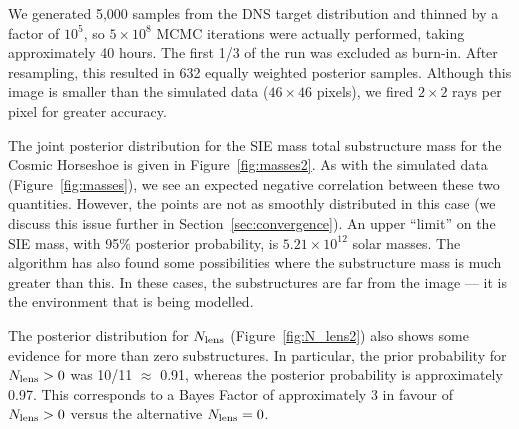 \documentclass[useAMS,usenatbib]{mn2e}
\begin{document}
We generated 5,000 samples from the DNS target distribution and thinned
by a factor of $10^5$, so $5 \times 10^8$ MCMC iterations were actually
performed, taking approximately 40 hours. The first 1/3 of the run was
excluded as burn-in. After resampling, this resulted in 632
equally weighted posterior samples. Although this image is smaller than the
simulated data ($46 \times 46$ pixels), we fired $2 \times 2$ rays per pixel
for greater accuracy.

The joint posterior distribution for the SIE mass total substructure mass
for the Cosmic Horseshoe is given in Figure~\ref{fig:masses2}. As with
the simulated data (Figure~\ref{fig:masses}), we see an expected negative
correlation between these two quantities. However, the points are not as
smoothly distributed in this case (we discuss this issue further
in Section~\ref{sec:convergence}). An upper ``limit'' on the SIE mass, with
95\% posterior probability, is $5.21 \times 10^{12}$ solar masses.
The algorithm has also found
some possibilities where the substructure mass is much greater than this. In
these cases, the substructures are far from the image --- it is the environment
that is being modelled.

The posterior distribution for
$N_{\rm lens}$ (Figure~\ref{fig:N_lens2})
also shows some evidence for more than zero substructures.
In particular, the prior probability for $N_{\rm lens} > 0$ was 10/11
$\approx$ 0.91, whereas the posterior probability is approximately 0.97.
This corresponds to a Bayes Factor of approximately 3 in favour of
$N_{\rm lens} > 0$ versus the alternative $N_{\rm lens} = 0$.
\end{document}
